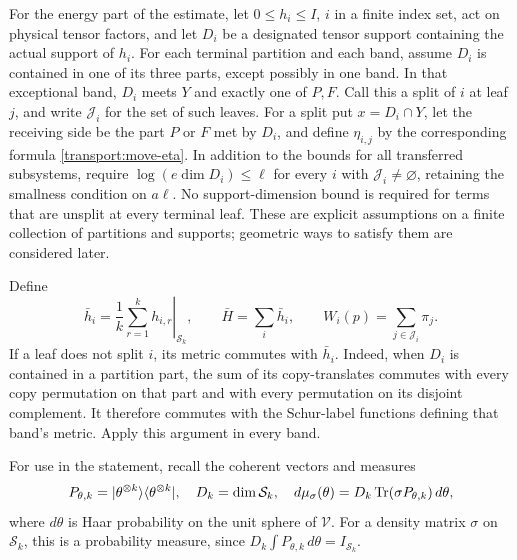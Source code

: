 For the energy part of the estimate, let $0\leq h_i\leq I$, $i$ in a
finite index set, act on physical tensor factors, and let $D_i$ be a
designated tensor support containing the actual support of $h_i$.
For each terminal partition and each band, assume $D_i$ is contained in
one of its three parts, except possibly in one band.  In that exceptional
band, $D_i$ meets $Y$ and exactly one of $P,F$.  Call this a split of
$i$ at leaf $j$, and write $\mathcal J_i$ for the set of such leaves.
For a split put $x=D_i\cap Y$, let the receiving side be the part
$P$ or $F$ met by $D_i$, and define $\eta_{i,j}$ by the corresponding
formula \eqref{transport:move-eta}.  In addition to the bounds for all
transferred subsystems, require
$\log(e\dim D_i)\leq\ell$ for every $i$ with
$\mathcal J_i\ne\varnothing$, retaining the smallness condition on
$a\ell$.  No support-dimension bound is required for terms that are
unsplit at every terminal leaf.
These are explicit assumptions on a finite collection of partitions and
supports; geometric ways to satisfy them are considered later.

Define
\begin{equation}\label{transport:replica-energy}
 \bar h_i=\left.\frac1k\sum_{r=1}^k h_{i,r}\right|_{\mathcal S_k},
 \qquad \bar H=\sum_i\bar h_i,
 \qquad W_i(p)=\sum_{j\in\mathcal J_i}\pi_j.
\end{equation}
If a leaf does not split $i$, its metric commutes with $\bar h_i$.
Indeed, when $D_i$ is contained in a partition part, the sum of its
copy-translates commutes with every copy permutation on that part and
with every permutation on its disjoint complement.  It therefore
commutes with the Schur-label functions defining that band's metric.
Apply this argument in every band.

For use in the statement, recall the coherent vectors and measures
\begin{equation}\label{transport:coherent-measure}
 P_{\theta,k}=|\theta^{\otimes k}\rangle\langle\theta^{\otimes k}|,
 \quad D_k=\dim\mathcal S_k,\quad
 d\mu_\sigma(\theta)=D_k\operatorname{Tr}(\sigma P_{\theta,k})\,d\theta,
\end{equation}
where $d\theta$ is Haar probability on the unit sphere of $\mathcal V$.
For a density matrix $\sigma$ on $\mathcal S_k$, this is a probability
measure, since $D_k\int P_{\theta,k}\,d\theta=I_{\mathcal S_k}$.

